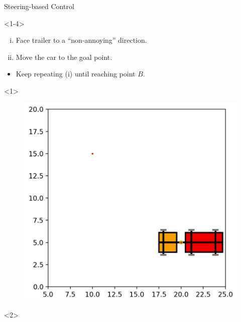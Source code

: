 \begin{frame}{Steering-based Control}

\begin{onlyenv}<1-4>
\begin{minipage}{.45\textwidth}
    \begin{enumerate}[(i)]
        \footnotesize
        \item<2,4> Face trailer to a “non-annoying” direction.
        \item<3,4> Move the car to the goal point.
    \end{enumerate}
    \begin{itemize}
        \item<4> Keep repeating (i) until reaching point $B$.
    \end{itemize}
\end{minipage}%
\begin{minipage}{.55\textwidth}
    \begin{onlyenv}<1>
    \begin{figure}[H]
        \centering
        \includegraphics[width=\textwidth]{images/snapshot1}
        \label{fig:points}
    \end{figure}
    \end{onlyenv}
    \begin{onlyenv}<2>
    \begin{figure}[H]
        \centering

\end{figure}
\end{onlyenv}
\end{minipage}
\end{onlyenv}
\end{frame}
